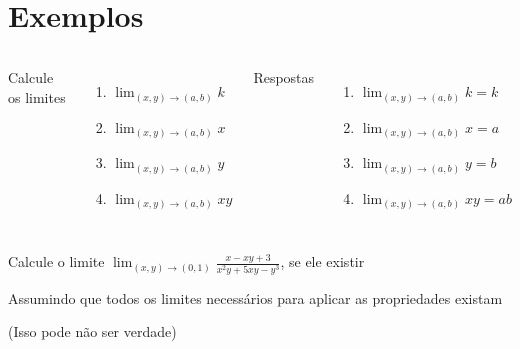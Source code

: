 \documentclass[fleqn,utf8,aspectratio=169,12pt,ignorenonframetext]{beamer}
\begin{document}
\section{Exemplos}

\begin{question}
\begin{columns}[t]
  Calcule os limites
  \vspace{0.5\baselineskip}
  \begin{enumerate}
    \setlength\itemsep{1.5em}
    \item \(\lim_{(x, y)\to(a, b)} k\)
    \item \(\lim_{(x, y)\to(a, b)} x\)
    \item \(\lim_{(x, y)\to(a, b)} y\)
    \item \(\lim_{(x, y)\to(a, b)} xy\)
  \end{enumerate}
  \pause
  Respostas
  \pause
  \vspace{0.5\baselineskip}
  \begin{enumerate}[<+->]
    \setlength\itemsep{1.5em}
    \item \(\lim_{(x, y)\to(a, b)} k  = k  \)
    \item \(\lim_{(x, y)\to(a, b)} x  = a  \)
    \item \(\lim_{(x, y)\to(a, b)} y  = b  \)
    \item \(\lim_{(x, y)\to(a, b)} xy = ab \)
  \end{enumerate}
\end{columns}
\end{question}

\begin{question}
  Calcule o limite
  \(
    \lim_{(x, y)\to(0, 1)} \frac{x-xy+3}{x^2y +5xy - y^3}
  \),
  se ele existir

  \pause
  \vspace{2\baselineskip}
  Assumindo que todos os limites necessários para aplicar as propriedades existam

  (Isso pode não ser verdade)
\end{question}
\end{document}
